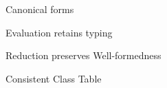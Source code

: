 \documentclass[acmlarge, anonymous, authordraft, review]{acmart} %
\begin{document}
\begin{lemma}{Canonical forms}{}
  \begin{conds}
    \cond{$\WFp\K{\e~\s}$}    
    \cond{$\EnvType\cdot\s\K\a\C$}
  \end{conds}

  \then\axiom{$\s[\a\mapsto{\obj\C{\b\a}}]$}

\end{lemma}

\begin{lemma}{Evaluation retains typing}{}
  \begin{conds}
    \cond{$\EnvType\cdot\s\K\e\t$}    
    \cond{$\EnvType\cdot\s\K\ep\tp$}
    \cond{$\WFp\K{\ep~\s}$}
    \cond{$\Reduce\K\ep\s\Kp\epp\sp$}
  \end{conds}

  \then{}
% 
\end{lemma}

\begin{lemma}{Reduction preserves Well-formedness}{}
  \begin{conds}
    \cond{$\Reduce \K\e\s \Kp\ep\sp$}    
    \cond{$\WFp\K{\e~\s}$}
  \end{conds}

  \then\axiom{$\WFp\Kp{\ep~\sp}$}

\end{lemma}

\begin{lemma}{Consistent Class Table}{}
  \begin{conds}
    \cond{$\WFp\K{\e~\s}$}    
  \end{conds}

  \then{}

\end{lemma}
\end{document}
